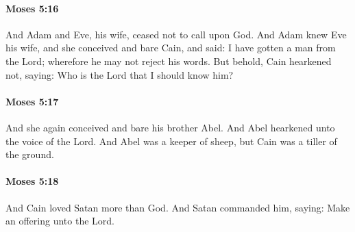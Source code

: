 		\paragraph{Moses 5:16} %
			\label{MOSES-5-16}

			And Adam and Eve, his wife, ceased not to call upon God. And Adam knew Eve his wife, and she conceived and bare Cain, and said: I have gotten a man from the Lord; wherefore he may not reject his words. But behold, Cain hearkened not, saying: Who is the Lord that I should know him?


		\paragraph{Moses 5:17} %
			\label{MOSES-5-17}

			And she again conceived and bare his brother Abel. And Abel hearkened unto the voice of the Lord. And Abel was a keeper of sheep, but Cain was a tiller of the ground.


		\paragraph{Moses 5:18} %
			\label{MOSES-5-18}

			And Cain loved Satan more than God. And Satan commanded him, saying: Make an offering unto the Lord.


